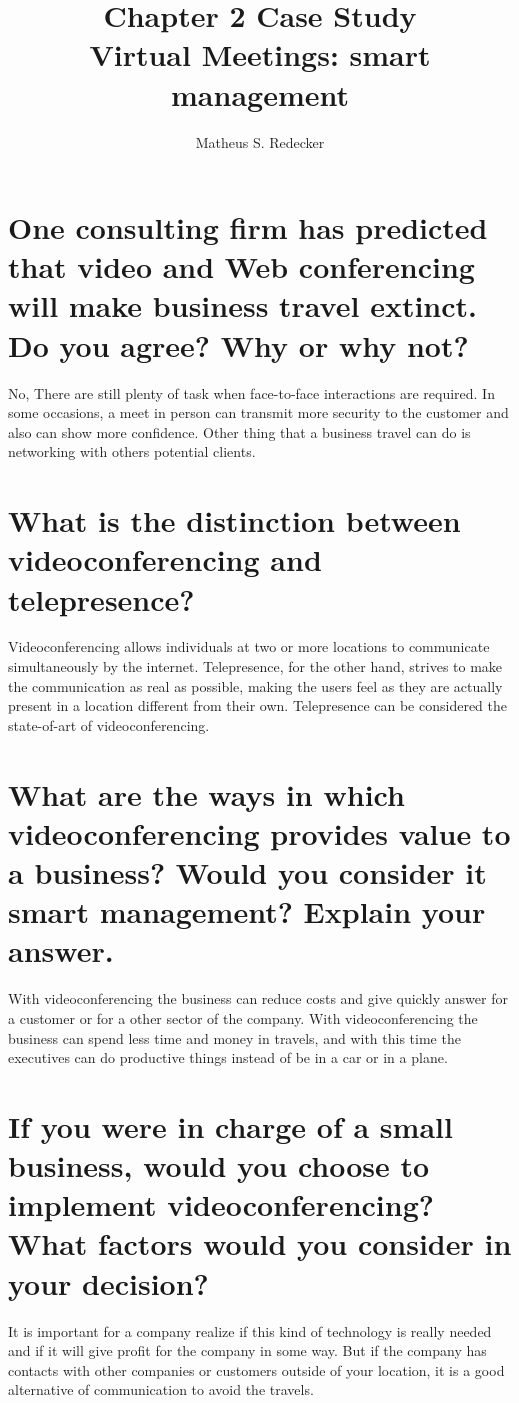 \documentclass[12pt]{article}
\title{Chapter 2 Case Study \\ Virtual Meetings: smart management}
\author{Matheus S. Redecker\inst{1} }
\begin{document}
 

\maketitle

\section{One consulting firm has predicted that video and
Web conferencing will make business travel
extinct. Do you agree? Why or why not?}
No, There are still plenty of task when face-to-face interactions are required. In some occasions, a meet in person can transmit more security to the customer and also can show more confidence. Other thing that a business travel can do is networking with others potential clients.   

\section{What is the distinction between videoconferencing
and telepresence?}

Videoconferencing allows individuals at two or more locations to communicate simultaneously by the internet. Telepresence, for the other hand, strives to make the communication as real as possible, making the users feel as they are actually present in a location different from their own. Telepresence can be considered the state-of-art of videoconferencing.

\section{What are the ways in which videoconferencing
provides value to a business? Would you consider
it smart management? Explain your answer.}
With videoconferencing the business can reduce costs and give quickly answer for a customer or for a other sector of the company. With videoconferencing the business can spend less time and money in travels, and with this time the executives can do productive things instead of be in a car or in a plane. 

\section{If you were in charge of a small business, would
you choose to implement videoconferencing?
What factors would you consider in your
decision?}
It is important for a company realize if this kind of technology is really needed and if it will give profit for the company in some way. But if the company has contacts with other companies or customers outside of your location, it is a good alternative of communication to avoid the travels. 
\end{document}

